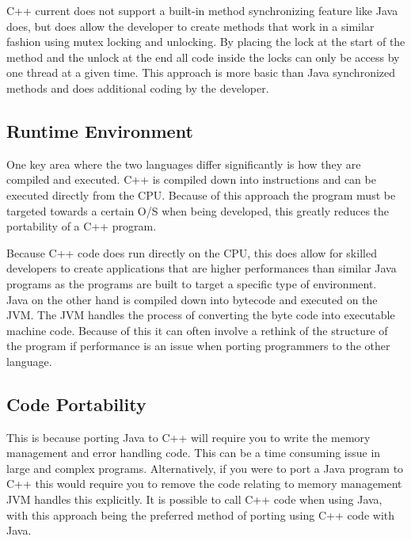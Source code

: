 \documentclass[10pt]{article}  %
\theoremstyle{definition}
\theoremstyle{remark}
\begin{document}
C++ current does not support a built-in method synchronizing feature like Java does, but does allow the developer to create methods that work in a similar fashion using mutex locking and unlocking. By placing the lock at the start of the method and the unlock at the end all code inside the locks can only be access by one thread at a given time. This approach is more basic than Java synchronized methods and does additional coding by the developer.



\subsection{Runtime Environment}\label{ss:back}

One key area where the two languages differ significantly is how they are compiled and executed. C++ is compiled down into instructions and can be executed directly from the CPU. Because of this approach the program must be targeted towards a certain O/S when being developed, this greatly reduces the portability of a C++ program. 

Because C++ code does run directly on the CPU, this does allow for skilled developers to create applications that are higher performances than similar Java programs as the programs are built to target a specific type of environment.\\

Java on the other hand is compiled down into bytecode and executed on the JVM. The JVM handles the process of converting the byte code into executable machine code. Because of this it can often involve a rethink of the structure of the program if performance is an issue when porting programmers to the other language. \\

\subsection{Code Portability}\label{ss:back}

This is because porting Java to C++ will require you to write the memory management and error handling code. This can be a time consuming issue in large and complex programs. Alternatively, if you were to port a Java program to C++ this would require you to remove the code relating to memory management JVM handles this explicitly. It is possible to call C++ code when using Java, with this approach being the preferred method of porting using C++ code with Java.\\
\end{document}
